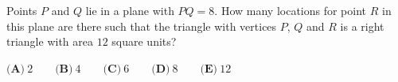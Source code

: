 Points $P$ and $Q$ lie in a plane with $PQ=8$. How many locations for point $R$ in this plane are there such that the triangle with vertices $P$, $Q$ and $R$ is a right triangle with area $12$ square units?

$\textbf{(A)}\ 2 \qquad\textbf{(B)}\ 4 \qquad\textbf{(C)}\ 6 \qquad\textbf{(D)}\ 8 \qquad\textbf{(E)}\ 12$
